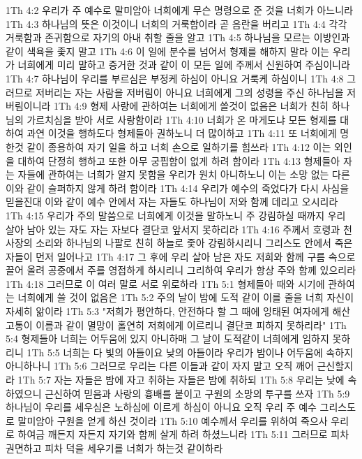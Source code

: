 1Th 4:2  우리가 주 예수로 말미암아 너희에게 무슨 명령으로 준 것을 너희가 아느니라
1Th 4:3  하나님의 뜻은 이것이니 너희의 거룩함이라 곧 음란을 버리고
1Th 4:4  각각 거룩함과 존귀함으로 자기의 아내 취할 줄을 알고
1Th 4:5  하나님을 모르는 이방인과 같이 색욕을 좇지 말고
1Th 4:6  이 일에 분수를 넘어서 형제를 해하지 말라 이는 우리가 너희에게 미리 말하고 증거한 것과 같이 이 모든 일에 주께서 신원하여 주심이니라
1Th 4:7  하나님이 우리를 부르심은 부정케 하심이 아니요 거룩케 하심이니
1Th 4:8  그러므로 저버리는 자는 사람을 저버림이 아니요 너희에게 그의 성령을 주신 하나님을 저버림이니라
1Th 4:9  형제 사랑에 관하여는 너희에게 쓸것이 없음은 너희가 친히 하나님의 가르치심을 받아 서로 사랑함이라
1Th 4:10  너희가 온 마게도냐 모든 형제를 대하여 과연 이것을 행하도다 형제들아 권하노니 더 많이하고
1Th 4:11  또 너희에게 명한것 같이 종용하여 자기 일을 하고 너희 손으로 일하기를 힘쓰라
1Th 4:12  이는 외인을 대하여 단정히 행하고 또한 아무 궁핍함이 없게 하려 함이라
1Th 4:13  형제들아 자는 자들에 관하여는 너희가 알지 못함을 우리가 원치 아니하노니 이는 소망 없는 다른 이와 같이 슬퍼하지 않게 하려 함이라
1Th 4:14  우리가 예수의 죽었다가 다시 사심을 믿을진대 이와 같이 예수 안에서 자는 자들도 하나님이 저와 함께 데리고 오시리라
1Th 4:15  우리가 주의 말씀으로 너희에게 이것을 말하노니 주 강림하실 때까지 우리 살아 남아 있는 자도 자는 자보다 결단코 앞서지 못하리라
1Th 4:16  주께서 호령과 천사장의 소리와 하나님의 나팔로 친히 하늘로 좇아 강림하시리니 그리스도 안에서 죽은 자들이 먼저 일어나고
1Th 4:17  그 후에 우리 살아 남은 자도 저희와 함께 구름 속으로 끌어 올려 공중에서 주를 영접하게 하시리니 그리하여 우리가 항상 주와 함께 있으리라
1Th 4:18  그러므로 이 여러 말로 서로 위로하라
1Th 5:1  형제들아 때와 시기에 관하여는 너희에게 쓸 것이 없음은
1Th 5:2  주의 날이 밤에 도적 같이 이를 줄을 너희 자신이 자세히 앎이라
1Th 5:3  "저희가 평안하다, 안전하다 할 그 때에 잉태된 여자에게 해산 고통이 이름과 같이 멸망이 홀연히 저희에게 이르리니 결단코 피하지 못하리라"
1Th 5:4  형제들아 너희는 어두움에 있지 아니하매 그 날이 도적같이 너희에게 임하지 못하리니
1Th 5:5  너희는 다 빛의 아들이요 낮의 아들이라 우리가 밤이나 어두움에 속하지 아니하나니
1Th 5:6  그러므로 우리는 다른 이들과 같이 자지 말고 오직 깨어 근신할지라
1Th 5:7  자는 자들은 밤에 자고 취하는 자들은 밤에 취하되
1Th 5:8  우리는 낮에 속하였으니 근신하여 믿음과 사랑의 흉배를 붙이고 구원의 소망의 투구를 쓰자
1Th 5:9  하나님이 우리를 세우심은 노하심에 이르게 하심이 아니요 오직 우리 주 예수 그리스도로 말미암아 구원을 얻게 하신 것이라
1Th 5:10  예수께서 우리를 위하여 죽으사 우리로 하여금 깨든지 자든지 자기와 함께 살게 하려 하셨느니라
1Th 5:11  그러므로 피차 권면하고 피차 덕을 세우기를 너희가 하는것 같이하라
